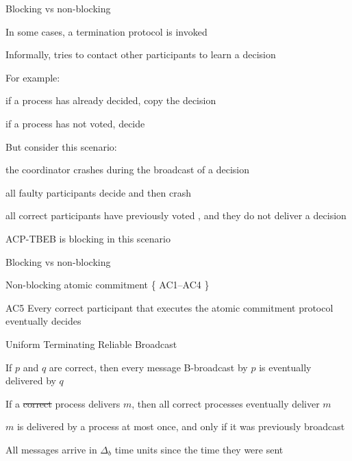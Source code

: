 \begin{frame}{Blocking vs non-blocking}
	
\BI
\item In some cases, a termination protocol is invoked
\item Informally, tries to contact other participants to learn a decision
	\BI 
	\item For example:
		\BI
		\item if a process has already decided, copy the decision
		\item if a process has not voted, decide \ABORT\
		\EI
	\EI
\item But consider this scenario:
	\BI
		\item the coordinator crashes during the broadcast of a decision
		\item all faulty participants decide and then crash
		\item all correct participants have previously voted \YES, and they do not deliver a decision
	\EI
\item ACP-TBEB is blocking in this scenario
\EI


\end{frame}

\begin{frame}{Blocking vs non-blocking}
	
 
\begin{block}{Non-blocking atomic commitment}
\{ AC1–AC4 \}
\BI
\item[AC5] Every correct participant that executes the atomic commitment protocol eventually decides
\EI
\end{block}
	
\end{frame}

\begin{frame}{Uniform Terminating Reliable Broadcast}
 
\begin{definition}
If $p$ and $q$ are correct, then every message B-broadcast by $p$ is eventually delivered by $q$
\end{definition}

\begin{definition}
If a \sout{correct} process delivers $m$, then all correct processes eventually deliver $m$
\end{definition}

\smallskip
\begin{definition}
$m$ is delivered by a process at most once, and only if it was previously broadcast
\end{definition}

\smallskip
\begin{definition}
All messages arrive in $\Delta_b$ time units since the time they were sent
\end{definition}
\end{frame}

